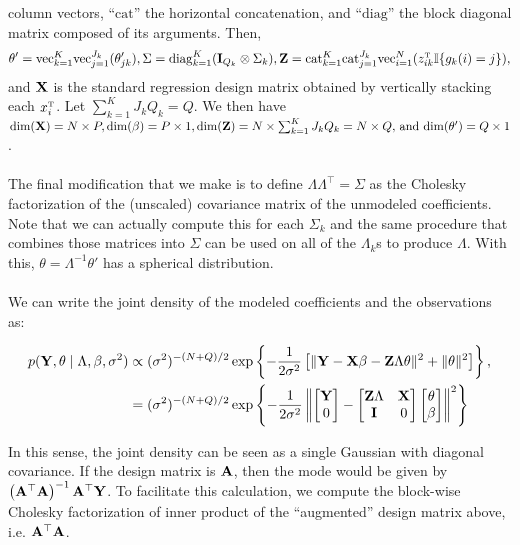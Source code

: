 \documentclass[10pt]{article}
\begin{document}
column vectors, ``\(\mathrm{cat}\)'' the horizontal
concatenation, and ``\(\mathrm{diag}\)'' the block diagonal matrix
composed of its arguments. Then,
\begin{equation*}
\theta' = \mathrm{vec}_{k=1}^K\mathrm{vec}_{j=1}^{J_k}(\theta_{jk}'),
\Sigma=\mathrm{diag}_{k=1}^K({\bf I}_{Q_k} \otimes \Sigma_k),
{\bf Z}=\mathrm{cat}_{k=1}^K\mathrm{cat}_{j=1}^{J_k}\mathrm{vec}_{i=1}^N
(z_{ik}^{\text{\tiny T}}\mathbb{I}\{g_k(i)=j\}),
\end{equation*}
and ${\bf X}$ is the standard regression design matrix obtained by
vertically stacking each $x_i^{\text{\tiny T}}$. Let $\sum_{k=1}^K J_k Q_k =
Q$. We then have
$\mathrm{dim}({\bf X}) = N\times P,
\mathrm{dim}(\beta) = P \times 1,
\mathrm{dim}({\bf Z})=N\times\sum_{k=1}^K J_k Q_k = N \times Q,\) and \(
\mathrm{dim}(\theta') = Q \times 1$. \\ \\
The final modification that we make is to define $\Lambda\Lambda^\top
= \Sigma$ as the Cholesky factorization of the (unscaled) covariance matrix of the
unmodeled coefficients. Note that we can actually compute this for
each $\Sigma_k$ and the same procedure that combines those matrices
into $\Sigma$ can be used on all of the $\Lambda_k$s to produce
$\Lambda$. With this, $\theta=\Lambda^{-1}\theta'$ has a spherical
distribution. \\ \\
We can write the joint density of the modeled coefficients and the
observations as:

\begin{align*}
p({\bf Y}, \theta \mid \Lambda, \beta, \sigma^2) & \propto
(\sigma^2)^{-(N + Q)/2}\exp\left\{
-\frac{1}{2\sigma^2}\left[ \|{\bf Y} - {\bf X}\beta - {\bf Z}\Lambda \theta\|^2 +
  \|\theta\|^2  \right]
\right\}, \\
%
& = (\sigma^2)^{-(N + Q)/2}\exp\left\{
-\frac{1}{2\sigma^2}\left\|
\begin{bmatrix} {\bf Y} \\ 0 \end{bmatrix} -
\begin{bmatrix} {\bf Z}\Lambda & {\bf X} \\
{\bf I} & 0 \end{bmatrix}
\begin{bmatrix} \theta \\ \beta \end{bmatrix}
\right\|^2
\right\}
\end{align*}

In this sense, the joint density can be seen as a single
Gaussian with diagonal covariance. If the design matrix is ${\bf A}$, then the
mode would be given by $\left({\bf A}^\top{\bf A}\right)^{-1}{\bf
  A}^\top{\bf Y}$. To facilitate this calculation, we compute the
block-wise Cholesky factorization of inner product of the ``augmented'' design matrix
above, i.e. ${\bf A}^\top{\bf A}$.
\end{document}
